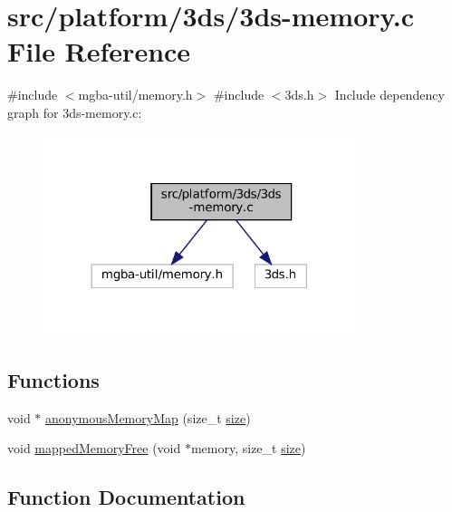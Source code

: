 \hypertarget{3ds-memory_8c}{}\section{src/platform/3ds/3ds-\/memory.c File Reference}
\label{3ds-memory_8c}
{\ttfamily \#include $<$mgba-\/util/memory.\+h$>$}\newline
{\ttfamily \#include $<$3ds.\+h$>$}\newline
Include dependency graph for 3ds-\/memory.c\+:
\nopagebreak
\begin{figure}[H]
\begin{center}
\leavevmode
\includegraphics[width=258pt]{3ds-memory_8c__incl}
\end{center}
\end{figure}
\subsection*{Functions}
\begin{DoxyCompactItemize}
\item 
void $\ast$ \mbox{\hyperlink{3ds-memory_8c_a5d8b8a54c5a5972efba2981636430417}{anonymous\+Memory\+Map}} (size\+\_\+t \mbox{\hyperlink{ioapi_8h_a014d89bd76f74ef3a29c8f04b473eb76}{size}})
\item 
void \mbox{\hyperlink{3ds-memory_8c_a3542970c4da761e3d6985de6d36d83d3}{mapped\+Memory\+Free}} (void $\ast$memory, size\+\_\+t \mbox{\hyperlink{ioapi_8h_a014d89bd76f74ef3a29c8f04b473eb76}{size}})
\end{DoxyCompactItemize}


\subsection{Function Documentation}
\mbox{\label{3ds-memory_8c_a5d8b8a54c5a5972efba2981636430417}} 
